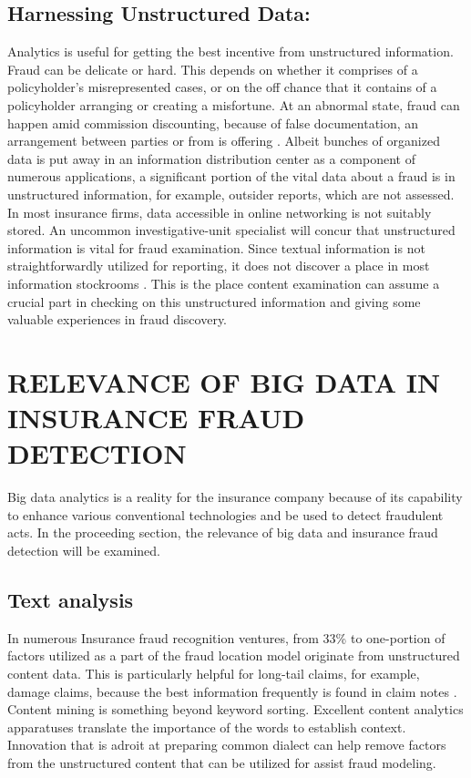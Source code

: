 \documentclass[sigconf]{acmart}
\begin{document}
\subsection{Harnessing Unstructured Data:}

Analytics is useful for getting the best incentive from unstructured information. Fraud can be delicate or hard. This depends on whether it comprises of a policyholder's misrepresented cases, or on the off chance that it contains of a policyholder arranging or creating a misfortune. At an abnormal state, fraud can happen amid commission discounting, because of false documentation, an arrangement between parties or from is offering \cite{12}. Albeit bunches of organized data is put away in an information distribution center as a component of numerous applications, a significant portion of the vital data about a fraud is in unstructured information, for example, outsider reports, which are not assessed. In most insurance firms, data accessible in online networking is not suitably stored. An uncommon investigative-unit specialist will concur that unstructured information is vital for fraud examination. Since textual information is not straightforwardly utilized for reporting, it does not discover a place in most information stockrooms \cite{17}. This is the place content examination can assume a crucial part in checking on this unstructured information and giving some valuable experiences in fraud discovery.


\section{RELEVANCE OF BIG DATA IN INSURANCE FRAUD DETECTION}
Big data analytics is a reality for the insurance company because of its capability to enhance various conventional technologies and be used to detect fraudulent acts. In the proceeding section, the relevance of big data and insurance fraud detection will be examined.

\subsection{Text analysis}

In numerous Insurance fraud recognition ventures, from 33{\%} to one-portion of factors utilized as a part of the fraud location model originate from unstructured content data. This is particularly helpful for long-tail claims, for example, damage claims, because the best information frequently is found in claim notes \cite{18} . Content mining is something beyond keyword sorting. Excellent content analytics apparatuses translate the importance of the words to establish context. Innovation that is adroit at preparing common dialect can help remove factors from the unstructured content that can be utilized for assist fraud modeling.
\end{document}
